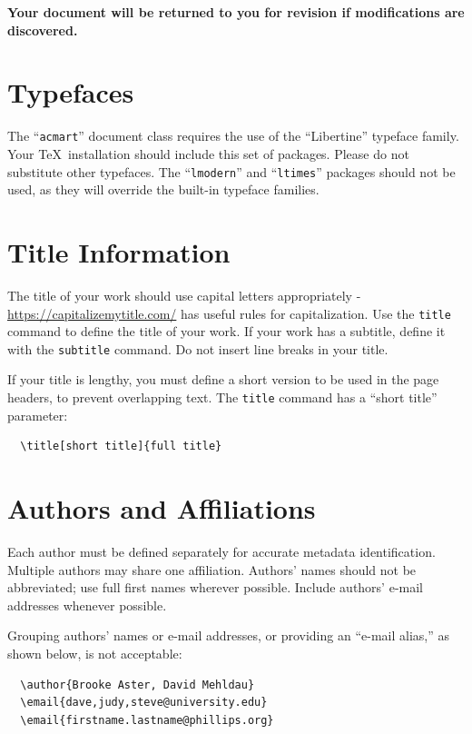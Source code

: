 \documentclass[acmlarge,11pt]{acmart}
\begin{document}
{\bfseries Your document will be returned to you for revision if
  modifications are discovered.}

\section{Typefaces}

The ``\verb|acmart|'' document class requires the use of the
``Libertine'' typeface family. Your \TeX\ installation should include
this set of packages. Please do not substitute other typefaces. The
``\verb|lmodern|'' and ``\verb|ltimes|'' packages should not be used,
as they will override the built-in typeface families.

\section{Title Information}

The title of your work should use capital letters appropriately -
\url{https://capitalizemytitle.com/} has useful rules for
capitalization. Use the {\verb|title|} command to define the title of
your work. If your work has a subtitle, define it with the
{\verb|subtitle|} command.  Do not insert line breaks in your title.

If your title is lengthy, you must define a short version to be used
in the page headers, to prevent overlapping text. The \verb|title|
command has a ``short title'' parameter:
\begin{verbatim}
  \title[short title]{full title}
\end{verbatim}

\section{Authors and Affiliations}

Each author must be defined separately for accurate metadata
identification. Multiple authors may share one affiliation. Authors'
names should not be abbreviated; use full first names wherever
possible. Include authors' e-mail addresses whenever possible.

Grouping authors' names or e-mail addresses, or providing an ``e-mail
alias,'' as shown below, is not acceptable:
\begin{verbatim}
  \author{Brooke Aster, David Mehldau}
  \email{dave,judy,steve@university.edu}
  \email{firstname.lastname@phillips.org}
\end{verbatim}
\end{document}
